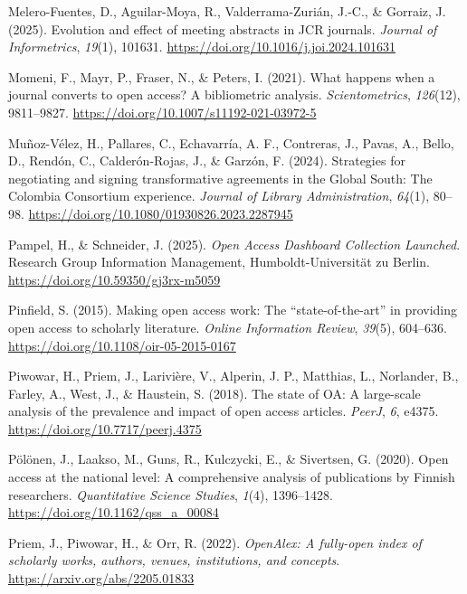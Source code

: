 \documentclass[a4paper,man,floatsintext,longtable,noextraspace,10pt]{apa6}
\newlength{\cslhangindent}
\newenvironment{CSLReferences}[2] %
{\begin{list}{}{%
  \setlength{\itemindent}{0pt}
  \setlength{\leftmargin}{0pt}
  \setlength{\parsep}{0pt}
  \ifodd #1
  \setlength{\leftmargin}{\cslhangindent}
  \setlength{\itemindent}{-1\cslhangindent}
  \fi
  \setlength{\itemsep}{#2\baselineskip}}}
{\end{list}}
\begin{document}
\begin{CSLReferences}{1}{0}
Melero-Fuentes, D., Aguilar-Moya, R., Valderrama-Zurián, J.-C., \&
Gorraiz, J. (2025). Evolution and effect of meeting abstracts in JCR
journals. \emph{Journal of Informetrics}, \emph{19}(1), 101631.
\url{https://doi.org/10.1016/j.joi.2024.101631}

Momeni, F., Mayr, P., Fraser, N., \& Peters, I. (2021). What happens
when a journal converts to open access? A bibliometric analysis.
\emph{Scientometrics}, \emph{126}(12), 9811--9827.
\url{https://doi.org/10.1007/s11192-021-03972-5}

Muñoz-Vélez, H., Pallares, C., Echavarría, A. F., Contreras, J., Pavas,
A., Bello, D., Rendón, C., Calderón-Rojas, J., \& Garzón, F. (2024).
Strategies for negotiating and signing transformative agreements in the
{Global South}: The {Colombia Consortium} experience. \emph{Journal of
Library Administration}, \emph{64}(1), 80--98.
\url{https://doi.org/10.1080/01930826.2023.2287945}

Pampel, H., \& Schneider, J. (2025). \emph{Open {Access} {Dashboard}
{Collection} {Launched}}. {Research Group Information Management,
Humboldt-Universität zu Berlin}.
\url{https://doi.org/10.59350/gj3rx-m5059}

Pinfield, S. (2015). Making open access work: The {``state-of-the-art''}
in providing open access to scholarly literature. \emph{Online
Information Review}, \emph{39}(5), 604--636.
\url{https://doi.org/10.1108/oir-05-2015-0167}

Piwowar, H., Priem, J., Larivière, V., Alperin, J. P., Matthias, L.,
Norlander, B., Farley, A., West, J., \& Haustein, S. (2018). The state
of {OA}: A large-scale analysis of the prevalence and impact of open
access articles. \emph{{PeerJ}}, \emph{6}, e4375.
\url{https://doi.org/10.7717/peerj.4375}

Pölönen, J., Laakso, M., Guns, R., Kulczycki, E., \& Sivertsen, G.
(2020). Open access at the national level: A comprehensive analysis of
publications by {Finnish} researchers. \emph{Quantitative Science
Studies}, \emph{1}(4), 1396--1428.
\url{https://doi.org/10.1162/qss_a_00084}

Priem, J., Piwowar, H., \& Orr, R. (2022). \emph{OpenAlex: A fully-open
index of scholarly works, authors, venues, institutions, and concepts}.
\url{https://arxiv.org/abs/2205.01833}


\end{CSLReferences}
\end{document}
